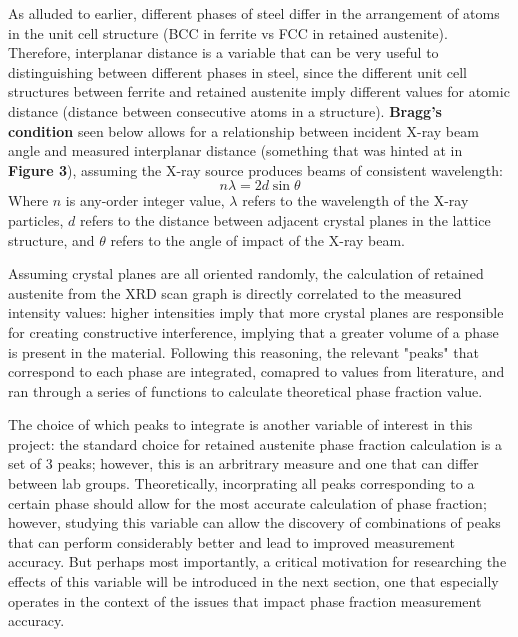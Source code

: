 \documentclass[10pt]{article}
\begin{document}
As alluded to earlier, different phases of steel differ in the arrangement of atoms in the unit cell structure
(BCC in ferrite vs FCC in retained austenite). Therefore, interplanar distance is a variable that can be very useful to distinguishing 
between different phases in steel, since the different unit cell structures between ferrite and retained austenite imply different values 
for atomic distance (distance between consecutive atoms in a structure). \textbf{Bragg's condition} seen below allows for a relationship between 
incident X-ray beam angle and measured interplanar distance (something that was hinted at in \textbf{Figure 3}), 
assuming the X-ray source produces beams of consistent wavelength:
\begin{equation}
    n\lambda = 2d\sin\theta 
\end{equation}
Where $n$ is any-order integer value, $\lambda$ refers to the wavelength of the X-ray particles, 
$d$ refers to the distance between adjacent crystal planes in the lattice structure, and $\theta$ refers to the
angle of impact of the X-ray beam.
  

   
Assuming crystal planes are all oriented randomly, the calculation of retained austenite from the XRD scan graph is directly correlated to 
the measured intensity values: higher intensities imply that more crystal planes are responsible for creating constructive interference, implying
that a greater volume of a phase is present in the material. Following this reasoning, the relevant "peaks" that correspond to each phase 
are integrated, comapred to values from literature, and ran through a series of functions to calculate theoretical phase fraction value. 

The choice of which peaks to integrate is another variable of interest in this project: the standard choice for retained austenite phase
fraction calculation is a set of 3 peaks; however, this is an arbritrary measure and one that can differ between lab groups. Theoretically,
incorprating all peaks corresponding to a certain phase should allow for the most accurate calculation of phase fraction; however, studying
this variable can allow the discovery of combinations of peaks that can perform considerably better and lead to improved measurement accuracy.
But perhaps most importantly, a critical motivation for researching the effects of this variable will be introduced in the next section, one that especially
operates in the context of the issues that impact phase fraction measurement accuracy.
\end{document}
